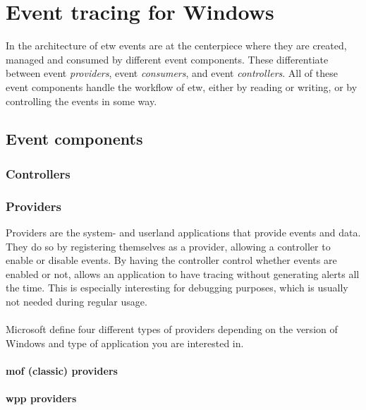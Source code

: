 \documentclass{report}
\begin{document}
\section{Event tracing for Windows}
\label{cha:etw}
In the architecture of \gls{etw} events are at the centerpiece where they are created, managed and consumed by different event components\cite{url:etw:about}. These differentiate between event \emph{providers}, event \emph{consumers}, and event \emph{controllers}. All of these event components handle the workflow of \gls{etw}, either by reading or writing, or by controlling the events in some way.

\subsection{Event components}
\subsubsection{Controllers}
\subsubsection{Providers}
Providers are the system- and userland applications that provide events and data. They do so by registering themselves as a provider, allowing a controller to enable or disable events. By having the controller control whether events are enabled or not, allows an application to have tracing without generating alerts all the time. This is especially interesting for debugging purposes, which is usually not needed during regular usage.
\\
\\
Microsoft define four different types of providers depending on the version of Windows and type of application you are interested in.

\paragraph{\gls{mof} (classic) providers}

\paragraph{\gls{wpp} providers}
\end{document}
